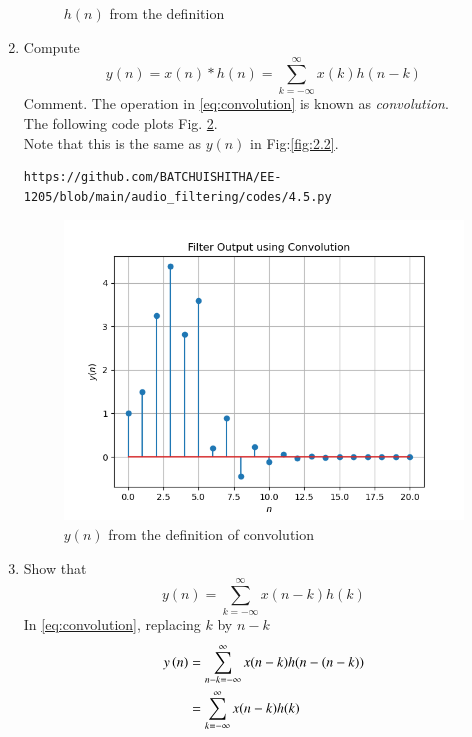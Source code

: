 \documentclass[journal,12pt,twocolumn]{IEEEtran}
\theoremstyle{remark}
\begin{document}
\begin{enumerate}[label=\thesection.\arabic*]
\begin{figure}[ht]
	\caption{$h(n)$ from the definition}
	\label{fig:4.4}
\end{figure}
\item Compute 
\begin{equation}
\label{eq:convolution}
y(n) = x(n)*h(n) = \sum_{k=-\infty}^{\infty}x(k)h(n-k)
\end{equation}
Comment. The operation in \eqref{eq:convolution} is known as
{\em convolution}.\\
\solution The following code plots Fig. \ref{fig:4.5}. \\
Note that this is the same as $y(n)$ in  Fig:\ref{fig:2.2}. 

\begin{lstlisting}
https://github.com/BATCHUISHITHA/EE-1205/blob/main/audio_filtering/codes/4.5.py
\end{lstlisting}
\begin{figure}[ht]
\centering
\includegraphics[width=\columnwidth]{figs/4.5.png}
\caption{$y(n)$ from the definition of convolution}
\label{fig:4.5}
\end{figure}
\newpage
\item Show that
\begin{equation}
y(n) =  \sum_{k=-\infty}^{\infty}x(n-k)h(k)
\end{equation}
\solution
In \eqref{eq:convolution}, replacing $k$ by $n - k$ 
\begin{align}
y\left(n\right) &= \sum_{n-k=-\infty}^{\infty}x(n-k)h(n-(n-k)) \\
 &= \sum_{k=-\infty}^{\infty}x(n - k)h(k)
\end{align}
\end{enumerate}
\end{document}
